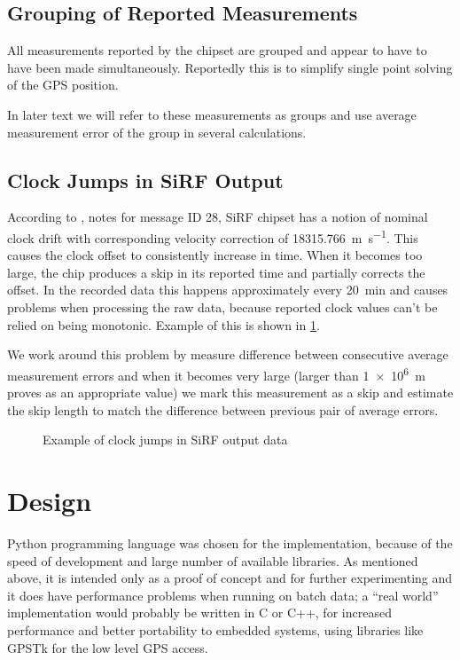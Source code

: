 \subsection{Grouping of Reported Measurements}
All measurements reported by the chipset are grouped and appear
to have to have been made simultaneously.
Reportedly this is to simplify single point solving of the GPS position.

In later text we will refer to these measurements as groups and use average
measurement error of the group in several calculations.

\subsection{Clock Jumps in SiRF Output}
According to \cite{sirf-protocol}, notes for message ID 28, SiRF chipset has a
notion of nominal clock drift with corresponding velocity correction of \SI{18315.766}{\meter\per\second}.
This causes the clock offset to consistently increase in time.
When it becomes too large, the chip produces a skip in its reported time and
partially corrects the offset.
In the recorded data this happens approximately every \SI{20}{\minute} and causes
problems when processing the raw data, because reported clock values
can't be relied on being monotonic.
Example of this is shown in \cref{fig:impl-clock-jumps}.

We work around this problem by measure difference between consecutive average
measurement errors and when it becomes very large (larger than \SI{1e6}{\meter} proves as an
appropriate value) we mark this measurement as a skip and estimate the skip
length to match the difference between previous pair of average errors.

\begin{figure}[tp]
	\centering
	\caption{Example of clock jumps in SiRF output data}
	\label{fig:impl-clock-jumps}
\end{figure}

\section{Design}
Python programming language was chosen for the implementation,
because of the speed of development and large number of available libraries.
As mentioned above, it is intended only as a proof of
concept and for further experimenting and it does have performance problems
when running on batch data; a \enquote{real world} implementation
would probably be written in C or C++, for increased performance and better portability
to embedded systems, using libraries like GPSTk \cite{tolman04} for the low level GPS access.

